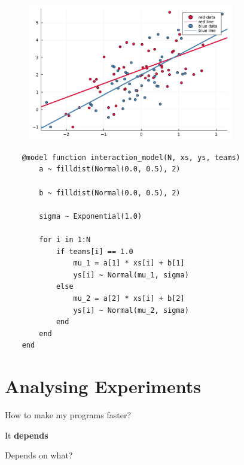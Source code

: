 \documentclass[aspectratio=169,xcolor=svgnames]{beamer}
\begin{document}
\begin{frame}
  \begin{figure}[ht]
    \centering
    \includegraphics[width=0.8\textwidth]{figures/plot_interaction.pdf}
  \end{figure}
\end{frame}

\begin{frame}[fragile]
  \begin{verbatim}
    @model function interaction_model(N, xs, ys, teams)
        a ~ filldist(Normal(0.0, 0.5), 2)

        b ~ filldist(Normal(0.0, 0.5), 2)

        sigma ~ Exponential(1.0)

        for i in 1:N
            if teams[i] == 1.0
                mu_1 = a[1] * xs[i] + b[1]
                ys[i] ~ Normal(mu_1, sigma)
            else
                mu_2 = a[2] * xs[i] + b[2]
                ys[i] ~ Normal(mu_2, sigma)
            end
        end
    end
  \end{verbatim}
\end{frame}

\section{Analysing Experiments}

\begin{frame}
  How to make my programs faster?

  \pause
  It \textbf{depends}

  \pause
  Depends on what?
\end{frame}

\begin{frame}
  \center
\end{frame}
\end{document}

